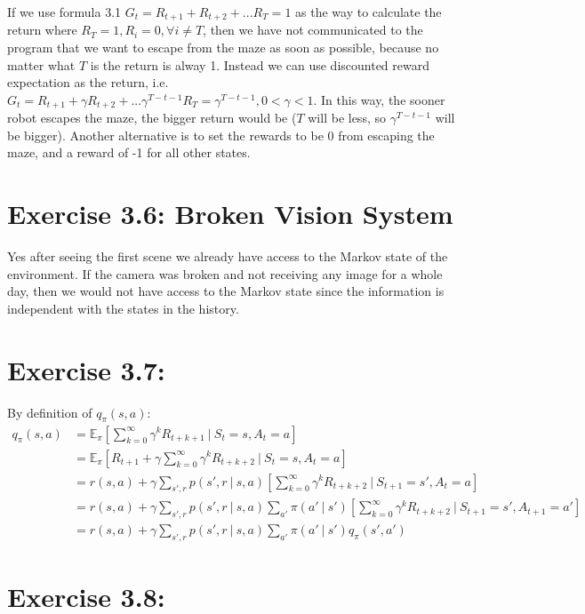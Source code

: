 \documentclass[10pt,letterpaper]{article}
\newcommand\given[1][]{\:#1\vert\:}
\begin{document}
If we use formula 3.1 $G_t = R_{t+1} + R_{t+2} + ... R_{T} = 1$ as the way to calculate the return where $R_{T}=1, R_i=0, \forall i\neq T$, then we have not communicated to the program that we want to escape from the maze as soon as possible, because no matter what $T$ is the return is alway 1. Instead we can use discounted reward expectation as the return, i.e. $G_t = R_{t+1} + \gamma R_{t+2} + ... \gamma^{T-t-1}R_{T} = \gamma^{T-t-1}, 0<\gamma<1$. In this way, the sooner robot escapes the maze, the bigger return would be ($T$ will be less, so $\gamma^{T-t-1}$ will be bigger). Another alternative is to set the rewards to be 0 from escaping the maze, and a reward of -1 for all other states.

\section*{Exercise 3.6: Broken Vision System}
\label{3.6}

Yes after seeing the first scene we already have access to the Markov state of the environment. If the camera was broken and not receiving any image for a whole day, then we would not have access to the Markov state since the information is independent with the states in the history.


\section*{Exercise 3.7: }
\label{3.7}
By definition of $q_\pi(s,a)$:
\begin{align}
q_\pi(s,a) &= \mathbb{E}_{\pi}[{\sum_{k=0}^\infty{\gamma^kR_{t+k+1}}\given S_t=s, A_t=a}]\\
&= \mathbb{E}_{\pi}[R_{t+1} + \gamma\sum_{k=0}^\infty{\gamma^kR_{t+k+2}}\given S_t=s, A_t=a]\\
&= r(s,a) + \gamma\sum_{s',r}p(s',r\given s,a)[\sum_{k=0}^\infty\gamma^kR_{t+k+2} \given S_{t+1}=s', A_t=a]\\
&= r(s,a) + \gamma\sum_{s',r}p(s',r\given s,a)\sum_{a'}\pi(a'\given s')[\sum_{k=0}^\infty\gamma^kR_{t+k+2} \given S_{t+1}=s', A_{t+1}=a']\\
&= r(s,a) + \gamma\sum_{s',r}p(s',r\given s,a)\sum_{a'}\pi(a'\given s')q_\pi(s',a')
\end{align}


\section*{Exercise 3.8: }
\label{3.8}
\end{document}
